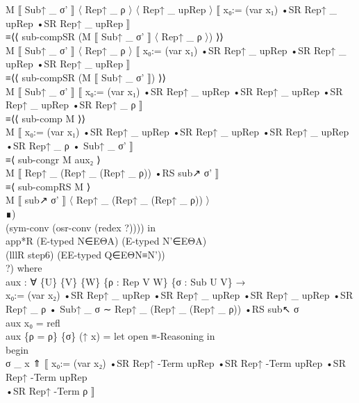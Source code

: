{\begin{code}
{\>                           M ⟦ Sub↑ \_ σ' ⟧ 〈 Rep↑ \_ ρ 〉 〈 Rep↑ \_ upRep 〉 ⟦ x₀:= (var x₁) •SR Rep↑ \_ upRep •SR Rep↑ \_ upRep ⟧\<\\
\>                         ≡⟨⟨ sub-compSR (M ⟦ Sub↑ \_ σ' ⟧ 〈 Rep↑ \_ ρ 〉) ⟩⟩\<\\
\>                           M ⟦ Sub↑ \_ σ' ⟧ 〈 Rep↑ \_ ρ 〉 ⟦ x₀:= (var x₁) •SR Rep↑ \_ upRep •SR Rep↑ \_ upRep •SR Rep↑ \_ upRep ⟧\<\\
\>                         ≡⟨⟨ sub-compSR (M ⟦ Sub↑ \_ σ' ⟧) ⟩⟩\<\\
\>                           M ⟦ Sub↑ \_ σ' ⟧ ⟦ x₀:= (var x₁) •SR Rep↑ \_ upRep •SR Rep↑ \_ upRep •SR Rep↑ \_ upRep •SR Rep↑ \_ ρ ⟧\<\\
\>                         ≡⟨⟨ sub-comp M ⟩⟩\<\\
\>                           M ⟦ x₀:= (var x₁) •SR Rep↑ \_ upRep •SR Rep↑ \_ upRep •SR Rep↑ \_ upRep •SR Rep↑ \_ ρ • Sub↑ \_ σ' ⟧\<\\
\>                         ≡⟨ sub-congr M aux₂ ⟩\<\\
\>                           M ⟦ Rep↑ \_ (Rep↑ \_ (Rep↑ \_ ρ)) •RS sub↗ σ' ⟧\<\\
\>                         ≡⟨ sub-compRS M ⟩ \<\\
\>                           M ⟦ sub↗ σ' ⟧ 〈 Rep↑ \_ (Rep↑ \_ (Rep↑ \_ ρ)) 〉\<\\
\>                           ∎)\<\\
\>                           (sym-conv (osr-conv (redex ?)))) in\<\\
\>      app*R (E-typed N∈EΘA) (E-typed N'∈EΘA) \<\\
\>      (lllR step6) (EE-typed Q∈EΘN≡N'))\<\\
\>      ?) where\<\\
\>    aux : ∀ \{U\} \{V\} \{W\} \{ρ : Rep V W\} \{σ : Sub U V\} → \<\\
\>        x₀:= (var x₂) •SR Rep↑ \_ upRep •SR Rep↑ \_ upRep •SR Rep↑ \_ upRep •SR Rep↑ \_ ρ • Sub↑ \_ σ ∼ Rep↑ \_ (Rep↑ \_ (Rep↑ \_ ρ)) •RS sub↖ σ\<\\
\>    aux x₀ = refl\<\\
\>    aux \{ρ = ρ\} \{σ\} (↑ x) = let open ≡-Reasoning in \<\\
\>      begin\<\\
\>        σ \_ x ⇑ ⟦ x₀:= (var x₂) •SR Rep↑ -Term upRep •SR Rep↑ -Term upRep •SR\<\\
\>       Rep↑ -Term upRep\<\\
\>       •SR Rep↑ -Term ρ ⟧\<\\
}
\end{code}}
